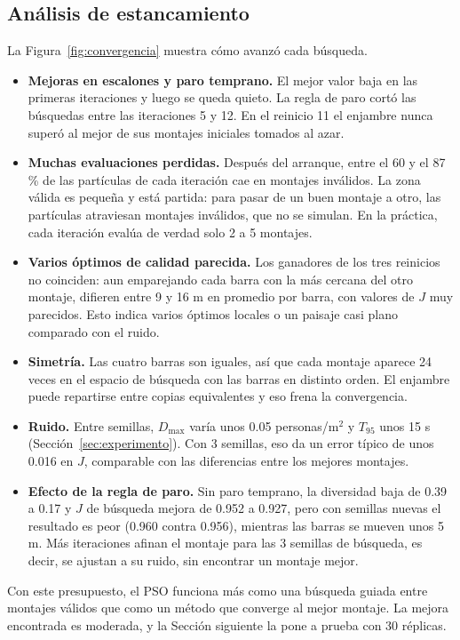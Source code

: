 \documentclass[11pt,letterpaper]{article}
\begin{document}
\subsection{Análisis de estancamiento}
La Figura~\ref{fig:convergencia} muestra cómo avanzó cada búsqueda.
\begin{itemize}
\item \textbf{Mejoras en escalones y paro temprano.} El mejor valor baja en las primeras iteraciones y luego se queda quieto. La regla de paro cortó las búsquedas entre las iteraciones 5 y 12. En el reinicio 11 el enjambre nunca superó al mejor de sus montajes iniciales tomados al azar.
\item \textbf{Muchas evaluaciones perdidas.} Después del arranque, entre el 60 y el 87\,\% de las partículas de cada iteración cae en montajes inválidos. La zona válida es pequeña y está partida: para pasar de un buen montaje a otro, las partículas atraviesan montajes inválidos, que no se simulan. En la práctica, cada iteración evalúa de verdad solo 2 a 5 montajes.
\item \textbf{Varios óptimos de calidad parecida.} Los ganadores de los tres reinicios no coinciden: aun emparejando cada barra con la más cercana del otro montaje, difieren entre 9 y 16 m en promedio por barra, con valores de $J$ muy parecidos. Esto indica varios óptimos locales o un paisaje casi plano comparado con el ruido.
\item \textbf{Simetría.} Las cuatro barras son iguales, así que cada montaje aparece 24 veces en el espacio de búsqueda con las barras en distinto orden. El enjambre puede repartirse entre copias equivalentes y eso frena la convergencia.
\item \textbf{Ruido.} Entre semillas, $D_{\max}$ varía unos 0.05 personas/m$^2$ y $T_{95}$ unos 15 s (Sección~\ref{sec:experimento}). Con 3 semillas, eso da un error típico de unos 0.016 en $J$, comparable con las diferencias entre los mejores montajes.
\item \textbf{Efecto de la regla de paro.} Sin paro temprano, la diversidad baja de 0.39 a 0.17 y $J$ de búsqueda mejora de 0.952 a 0.927, pero con semillas nuevas el resultado es peor (0.960 contra 0.956), mientras las barras se mueven unos 5 m. Más iteraciones afinan el montaje para las 3 semillas de búsqueda, es decir, se ajustan a su ruido, sin encontrar un montaje mejor.
\end{itemize}

Con este presupuesto, el PSO funciona más como una búsqueda guiada entre montajes válidos que como un método que converge al mejor montaje. La mejora encontrada es moderada, y la Sección siguiente la pone a prueba con 30 réplicas.
\end{document}
